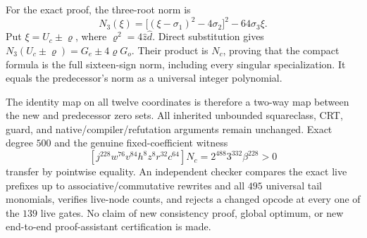 For the exact proof, the three-root norm is
\[
 N_3(\xi)=\big[(\xi-\sigma_1)^2-4\sigma_2\big]^2-64\sigma_3\xi.
\]
Put $\xi=U_c\pm\varrho$, where $\varrho^2=4\widehat z\widehat d$.
Direct substitution gives
$N_3(U_c\pm\varrho)=G_e\pm4\varrho G_o$. Their product is $N_c$,
proving that the compact formula is the full sixteen-sign norm, including
every singular specialization. It equals the predecessor's norm as a
universal integer polynomial.

The identity map on all twelve coordinates is therefore a two-way map
between the new and predecessor zero sets. All inherited unbounded
squareclass, CRT, guard, and native/compiler/refutation arguments remain
unchanged. Exact degree $500$ and the genuine fixed-coefficient witness
\[
 [j^{228}w^{76}v^{84}h^8z^8r^{32}c^{64}]N_c
   =2^{488}3^{332}\beta^{228}>0
\]
transfer by pointwise equality. An independent checker compares the exact
live prefixes up to associative/commutative rewrites and all $495$ universal tail monomials, verifies live-node
counts, and rejects a changed opcode at every one of the $139$ live gates.
No claim of new consistency proof, global optimum, or new end-to-end
proof-assistant certification is made.
